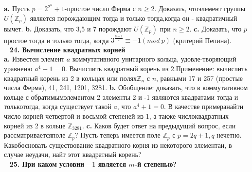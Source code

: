 \documentclass{mai_book}
\begin{document}
	\textbf{a.} Пусть $p=2^{2^n}+1$-простое число Ферма с $n\geqslant 2.$ Доказать, что\newline элемент группы $U(\mathbb{Z}_p)$ является порождающим тогда и только тогда,\newline когда он - квадратичный вычет.\newline
\hspace*{15pt}\textbf{b.} Доказать, что 3,5 и 7 порождают $U(\mathbb{Z}_p)$ при $n\geqslant 2.$\newline
\hspace*{15pt}\textbf{c.} Доказать, что $p$ простое тогда и только тогда, когда $3^{\frac{p-1}{2}}\equiv-1$\newline $(mod\ p)$ (критерий Пепина).\\
\ \newline
\noindent\textbf{24. Вычисление квадратных корней}\\

	\textbf{a.} Известен элемент $a$ коммутативного унитарного кольца, удовле-\newline творяющий уравненю $a^4+1=0.$ Вычислить квадратный корень из 2.\newline Применение: вычислить квадратный корень из 2 в кольцах или полях\newline $\mathbb{Z}_n$ с $n$, равными 17 и 257 (простые числа Ферма), 41, 241, 1201, 3281.\newline 
\hspace*{15pt}\textbf{b.} Обобщение: доказать, что в коммутативном кольце с обратимым\newline элементом 2 элементы 2 и -1 являются квадратами тогда и только\newline тогда, когда существует такой $a$, что $a^4+1=0$. В качестве примера\newline найти число корней четвертой и восьмой степеней из 1, а также число\newline квадратных корней из 2 в кольце $\mathbb{Z}_{3281}$.\newline
\hspace*{15pt}\textbf{c.} Каков будет ответ на предыдущий вопрос, если рассматривается\newline поле $\mathbb{Z}_p$? Пусть теперь имеется поле $\mathbb{Z}_p$ с $p=2q+1, q$ нечетно. Как\newline обосновать существование квадратного корня из некоторого элемента\newline и, в случае неудачи, найт этот квадратный корень?\\
\ \newline
\noindent\textbf{25. При каком условии $-1$ является $m$-й степенью?}\\
\end{document}
